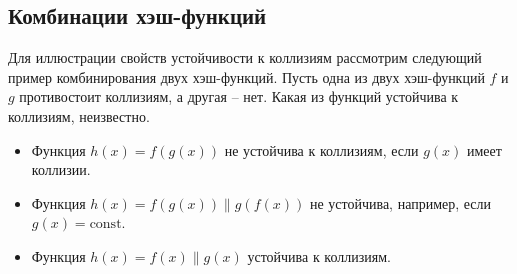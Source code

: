 \subsection{Комбинации хэш-функций}

Для иллюстрации свойств устойчивости к коллизиям рассмотрим следующий пример комбинирования двух хэш-функций. Пусть одна из двух хэш-функций $f$ и $g$ противостоит коллизиям, а другая -- нет. Какая из функций устойчива к коллизиям, неизвестно.
\begin{itemize}
    \item Функция $h(x) = f(g(x))$ не устойчива к коллизиям, если $g(x)$ имеет коллизии.
    \item Функция $h(x) = f(g(x)) \| g(f(x))$ не устойчива, например, если $g(x) = \textrm{const}$.
    \item Функция $h(x) = f(x) \| g(x)$ устойчива к коллизиям.
\end{itemize}
